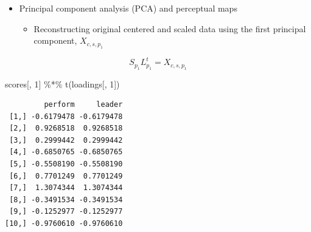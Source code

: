\documentclass[
  ignorenonframetext,
]{beamer}
\newenvironment{Shaded}{\begin{snugshade}}{\end{snugshade}}
\newcommand{\DecValTok}[1]{\textcolor[rgb]{0.68,0.00,0.00}{#1}}
\newcommand{\FunctionTok}[1]{\textcolor[rgb]{0.28,0.35,0.67}{#1}}
\newcommand{\NormalTok}[1]{\textcolor[rgb]{0.00,0.23,0.31}{#1}}
\newcommand{\SpecialCharTok}[1]{\textcolor[rgb]{0.37,0.37,0.37}{#1}}
\providecommand{\tightlist}{%
  \setlength{\itemsep}{0pt}\setlength{\parskip}{0pt}}\usepackage{longtable,booktabs,array}
\begin{document}
\begin{frame}[fragile]{}
\label{section-36}
\begin{itemize}
\item
  Principal component analysis (PCA) and perceptual maps

  \begin{itemize}
  \tightlist
  \item
    Reconstructing original centered and scaled data using the first
    principal component, \(X_{c, s, p_1}\)
  \end{itemize}
\end{itemize}

\[S_{p_1}L_{p_1}^t = X_{c, s, p_1}\] \tiny

\begin{Shaded}
\begin{Highlighting}[]
\NormalTok{scores[, }\DecValTok{1}\NormalTok{] }\SpecialCharTok{\%*\%} \FunctionTok{t}\NormalTok{(loadings[, }\DecValTok{1}\NormalTok{])}
\end{Highlighting}
\end{Shaded}

\begin{verbatim}
         perform     leader
 [1,] -0.6179478 -0.6179478
 [2,]  0.9268518  0.9268518
 [3,]  0.2999442  0.2999442
 [4,] -0.6850765 -0.6850765
 [5,] -0.5508190 -0.5508190
 [6,]  0.7701249  0.7701249
 [7,]  1.3074344  1.3074344
 [8,] -0.3491534 -0.3491534
 [9,] -0.1252977 -0.1252977
[10,] -0.9760610 -0.9760610
\end{verbatim}
\end{frame}
\end{document}
